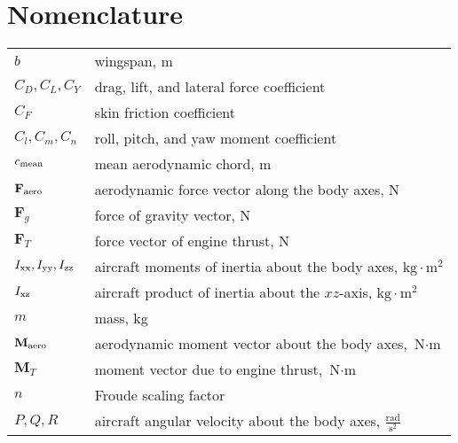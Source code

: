 \section*{Nomenclature}

{\renewcommand\arraystretch{1.0}
	\noindent\begin{longtable*}{@{}l @{\quad=\quad} l@{}}
		$b$ & wingspan, m \\
		$C_{D}, C_{L}, C_{Y}$ & drag, lift, and lateral force coefficient \\
		$C_{F}$ & skin friction coefficient \\
		$C_{l}, C_{m}, C_{n}$ & roll, pitch, and yaw moment coefficient \\
		$c_{\textup{mean}}$ & mean aerodynamic chord, m \\
		$\textbf{F}_{\textup{aero}}$ & aerodynamic force vector along the body axes, N\\
		$\textbf{F}_{g}$ & force of gravity vector, N \\
		$\textbf{F}_{T}$ & force vector of engine thrust, N \\
		$I_{\textup{xx}}, I_{\textup{yy}}, I_{\textup{zz}}$   & aircraft moments of inertia about the body axes, $\text{kg} \cdot \text{m}^2$ \\
		$I_{\textup{xz}}$ & aircraft product of inertia about the $xz$-axis, $\text{kg} \cdot \text{m}^2$ \\
		$m$ & mass, kg \\
		$\textbf{M}_{\textup{aero}}$ & aerodynamic moment vector about the body axes, $\text{N} \cdot \text{m}$ \\
		$\textbf{M}_{T}$ & moment vector due to engine thrust, $\text{N} \cdot \text{m}$ \\
		$n$ & Froude scaling factor \\
		$P, Q, R$ & aircraft angular velocity about the body axes, $\tfrac{\text{rad}}{\text{s}^2}$ \\

\end{longtable*}}
